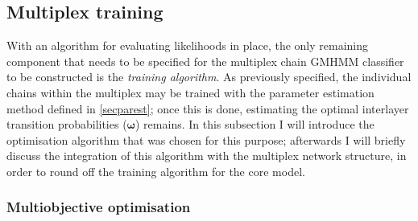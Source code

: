 \documentclass[12pt,a4paper,twoside,openright]{report}
\begin{document}
\subsection{Multiplex training}\label{secmultiobj}

With an algorithm for evaluating likelihoods in place, the only remaining component that needs to be specified for the multiplex chain GMHMM classifier to be constructed is the \emph{training algorithm}. As previously specified, the individual chains within the multiplex may be trained with the parameter estimation method defined in \cref{secparest}; once this is done, estimating the optimal interlayer transition probabilities ($\boldsymbol\omega$) remains. In this subsection I will introduce the optimisation algorithm that was chosen for this purpose; afterwards I will briefly discuss the integration of this algorithm with the multiplex network structure, in order to round off the training algorithm for the core model.

\subsubsection{Multiobjective optimisation}
\end{document}
